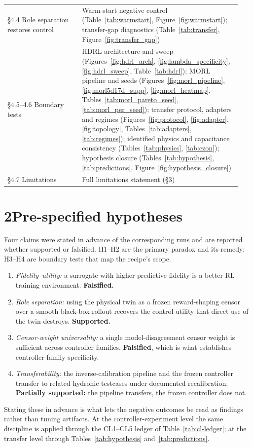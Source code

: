 \documentclass[11pt,a4paper]{article}
\begin{document}
\begin{longtable}{@{}p{0.30\linewidth}p{0.64\linewidth}@{}}
\S4.4 Role separation restores control & Warm-start negative control (Table~\ref{tab:warmstart}, Figure~\ref{fig:warmstart}); transfer-gap diagnostics (Table~\ref{tab:transfer}, Figure~\ref{fig:transfer_gap}) \\
\S4.5--4.6 Boundary tests & HDRL architecture and sweep (Figures~\ref{fig:hdrl_arch}, \ref{fig:lambda_specificity}, \ref{fig:hdrl_sweep}, Table~\ref{tab:hdrl}); MORL pipeline and seeds (Figures~\ref{fig:morl_pipeline}, \ref{fig:morl5d17d_supp}, \ref{fig:morl_heatmap}, Tables~\ref{tab:morl_pareto_seed}, \ref{tab:morl_per_seed}); transfer protocol, adapters and regimes (Figures~\ref{fig:protocol}, \ref{fig:adapter}, \ref{fig:topology}, Tables~\ref{tab:adapters}, \ref{tab:regimes}); identified physics and capacitance consistency (Tables~\ref{tab:physics}, \ref{tab:czon}); hypothesis closure (Tables~\ref{tab:hypothesis}, \ref{tab:predictions}, Figure~\ref{fig:hypothesis_closure}) \\
\S4.7 Limitations & Full limitations statement (\S3) \\
\bottomrule
\end{longtable}

\section*{2\quad Pre-specified hypotheses}
Four claims were stated in advance of the corresponding runs and are reported whether supported or
falsified. H1--H2 are the primary paradox and its remedy; H3--H4 are boundary tests that map the
recipe's scope.
\begin{enumerate}[label=\textbf{H\arabic*.},leftmargin=2.8em]
\item \emph{Fidelity--utility:} a surrogate with higher predictive fidelity is a better RL training environment. \textbf{Falsified.}
\item \emph{Role separation:} using the physical twin as a frozen reward-shaping censor over a smooth black-box rollout recovers the control utility that direct use of the twin destroys. \textbf{Supported.}
\item \emph{Censor-weight universality:} a single model-disagreement censor weight is sufficient across controller families. \textbf{Falsified}, which is what establishes controller-family specificity.
\item \emph{Transferability:} the inverse-calibration pipeline and the frozen controller transfer to related hydronic testcases under documented recalibration. \textbf{Partially supported:} the pipeline transfers, the frozen controller does not.
\end{enumerate}
Stating these in advance is what lets the negative outcomes be read as findings rather than tuning
artifacts. At the controller-experiment level the same discipline is applied through the CL1--CL5
ledger of Table~\ref{tab:cl-ledger}; at the transfer level through Tables~\ref{tab:hypothesis}
and~\ref{tab:predictions}.
\end{document}
